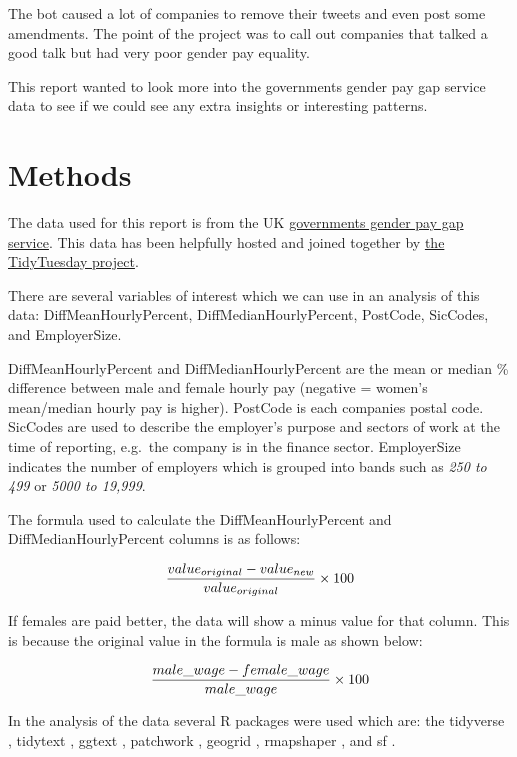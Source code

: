 \documentclass[
  11pt,
]{article}
\begin{document}
The bot caused a lot of companies to remove their tweets and even post
some amendments. The point of the project was to call out companies that
talked a good talk but had very poor gender pay equality.

This report wanted to look more into the governments gender pay gap
service data to see if we could see any extra insights or interesting
patterns.

\newpage

\hypertarget{methods}{%
\section{Methods}\label{methods}}

The data used for this report is from the UK
\href{https://gender-pay-gap.service.gov.uk/}{governments gender pay gap
service}. This data has been helpfully hosted and joined together by
\href{https://github.com/rfordatascience/tidytuesday/tree/master/data/2022/2022-06-28}{the
TidyTuesday project}.

There are several variables of interest which we can use in an analysis
of this data: DiffMeanHourlyPercent, DiffMedianHourlyPercent, PostCode,
SicCodes, and EmployerSize.

DiffMeanHourlyPercent and DiffMedianHourlyPercent are the mean or median
\% difference between male and female hourly pay (negative = women's
mean/median hourly pay is higher). PostCode is each companies postal
code. SicCodes are used to describe the employer's purpose and sectors
of work at the time of reporting, e.g.~the company is in the finance
sector. EmployerSize indicates the number of employers which is grouped
into bands such as \emph{250 to 499} or \emph{5000 to 19,999}.

The formula used to calculate the DiffMeanHourlyPercent and
DiffMedianHourlyPercent columns is as follows:

\[ {{value_{original} - value_{new}} \over {value_{original}}} \times 100 \]

If females are paid better, the data will show a minus value for that
column. This is because the original value in the formula is male as
shown below:

\[ {{male\_wage - female\_wage \over male\_wage}} \times 100 \]

In the analysis of the data several R packages were used which are: the
tidyverse \citep{tidyverse}, tidytext \citep{tidytext}, ggtext
\citep{ggtext}, patchwork \citep{patchwork}, geogrid \citep{geogrid},
rmapshaper \citep{rmapshaper}, and sf \citep{sf}.
\end{document}
